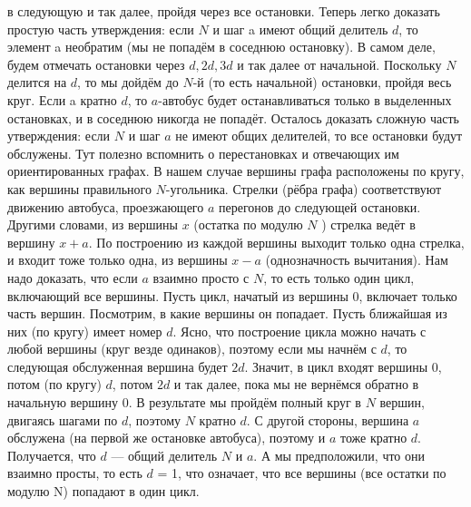 \documentclass{article}
\begin{document}
в следующую и так далее, пройдя через все остановки.
\newline
Теперь легко доказать простую часть утверждения: если $N$ и шаг a имеют общий
делитель $d$, то элемент a необратим (мы не попадём в соседнюю остановку). В самом деле, будем отмечать остановки через $d, 2d, 3d$ и так далее от начальной. Поскольку $N$ делится на $d$, то мы дойдём до $N$-й (то есть начальной) остановки, пройдя весь круг. Если a кратно $d$, то $a$-автобус будет останавливаться только в выделенных остановках, и в соседнюю никогда не попадёт.
\newline
Осталось доказать сложную часть утверждения: если $N$ и шаг $a$ не имеют общих делителей, то все остановки будут обслужены. Тут полезно вспомнить о перестановках и отвечающих им ориентированных графах.
\newline
В нашем случае вершины графа расположены по кругу, как вершины правильного $N$-угольника. Стрелки (рёбра графа) соответствуют движению автобуса, проезжающего $a$ перегонов до следующей остановки. Другими словами, из вершины $x$ (остатка по модулю $N$ ) стрелка ведёт в вершину $x + a$. По построению из каждой
вершины выходит только одна стрелка, и входит тоже только одна, из вершины $x-a$ (однозначность вычитания). Нам надо доказать, что если $a$ взаимно просто с $N$, то есть только один цикл, включающий все вершины.
\newline
Пусть цикл, начатый из вершины 0, включает только часть вершин. Посмотрим, в какие вершины он попадает. Пусть ближайшая из них (по кругу) имеет номер $d$.
Ясно, что построение цикла можно начать с любой вершины (круг везде одинаков), поэтому если мы начнём с $d$, то следующая обслуженная вершина будет $2d$. Значит, в цикл входят вершины 0, потом (по кругу) $d$, потом $2d$ и так далее, пока мы не вернёмся обратно в начальную вершину 0. В результате мы пройдём полный круг в $N$ вершин, двигаясь шагами по $d$, поэтому $N$ кратно $d$. С другой стороны, вершина $a$ обслужена (на первой же остановке автобуса), поэтому и $a$ тоже кратно $d$. Получается, что $d$ — общий делитель $N$ и $a$. А мы предположили, что они взаимно просты, то есть $d$ = 1, что означает, что все вершины (все остатки по модулю N) попадают в один цикл.
\end{document}

